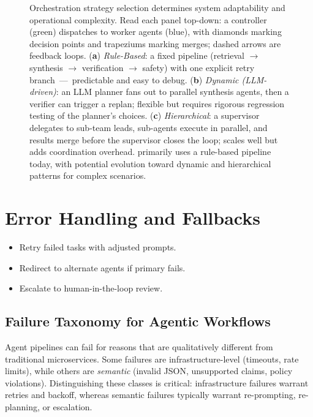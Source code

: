 \begin{figure}[t]
\caption[Orchestration strategy selection (rule-based, dynamic, hierarchical).]{%
Orchestration strategy selection determines system adaptability and operational complexity. Read each panel top-down: a controller (green) dispatches to worker agents (blue), with diamonds marking decision points and trapeziums marking merges; dashed arrows are feedback loops.
(\textbf{a}) \emph{Rule-Based}: a fixed pipeline (retrieval $\rightarrow$ synthesis $\rightarrow$ verification $\rightarrow$ safety) with one explicit retry branch~---~predictable and easy to debug.
(\textbf{b}) \emph{Dynamic (LLM-driven)}: an LLM planner fans out to parallel synthesis agents, then a verifier can trigger a replan; flexible but requires rigorous regression testing of the planner's choices.
(\textbf{c}) \emph{Hierarchical}: a supervisor delegates to sub-team leads, sub-agents execute in parallel, and results merge before the supervisor closes the loop; scales well but adds coordination overhead.
\ishtar{} primarily uses a rule-based pipeline today, with potential evolution toward dynamic and hierarchical patterns for complex scenarios.}
\label{fig:ch09_orchestration_strategies}
\end{figure}

\section{Error Handling and Fallbacks}\label{sec:errorhandling}
\begin{itemize}
    \item Retry failed tasks with adjusted prompts.
    \item Redirect to alternate agents if primary fails.
    \item Escalate to human-in-the-loop review.
\end{itemize}



\subsection{Failure Taxonomy for Agentic Workflows}
Agent pipelines can fail for reasons that are qualitatively different from traditional microservices.
Some failures are infrastructure-level (timeouts, rate limits), while others are \emph{semantic} (invalid JSON, unsupported claims, policy violations).
Distinguishing these classes is critical: infrastructure failures warrant retries and backoff, whereas semantic failures typically warrant re-prompting, re-planning, or escalation.

